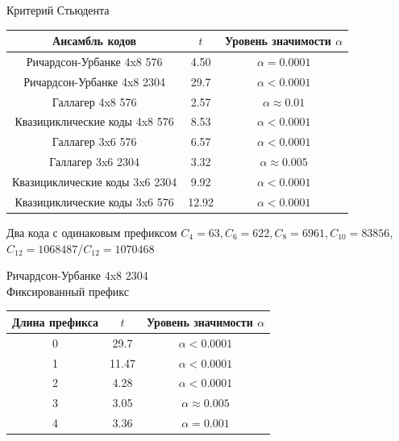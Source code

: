 \documentclass[t,13pt,graphics=pdflatex,xcolor=table,aspectratio=43]{beamer}
\begin{document}
\begin{frame}{Критерий Стьюдента}
\begin{center}
\begin{tabular}{|c|c|c|}
	\hline
	Ансамбль кодов & $t$ & Уровень значимости $\alpha$\\
	\hline
	Ричардсон-Урбанке 4x8 576 & 4.50 &  $\alpha = 0.0001$\\
	\hline
	Ричардсон-Урбанке 4x8 2304 & 29.7 & $\alpha < 0.0001$ \\
	\hline
	Галлагер 4x8 576 & 2.57 & $\alpha \approx 0.01$ \\
	\hline
	Квазициклические коды 4x8 576 & 8.53 & $\alpha < 0.0001$ \\
	\hline
	Галлагер 3x6 576 & 6.57 & $\alpha < 0.0001$ \\
	\hline
	Галлагер 3x6 2304 & 3.32 & $\alpha \approx 0.005$ \\
	\hline
	Квазициклические коды 3x6 2304 & 9.92 & $\alpha < 0.0001$ \\
	\hline
	Квазициклические коды 3x6 576 & 12.92 & $\alpha < 0.0001$ \\
	\hline
\end{tabular}
\end{center}
\end{frame}

\begin{frame}{Два кода с одинаковым префиксом}
$C_4=63, C_6=622, C_8=6961, C_{10}=83856$, $C_{12}=1068487$/$C_{12}=1070468$

\begin{figure}[h!]
\centering
\begin{subfigure}{.5\textwidth}
  \centering
\end{subfigure}%
\begin{subfigure}{.5\textwidth}
  \centering
\end{subfigure}
\end{figure}
\end{frame}

\begin{frame}{Ричардсон-Урбанке 4x8 2304 \\ Фиксированный префикс}
\begin{center}
\begin{tabular}{|c|c|c|}
	\hline
	Длина префикса & $t$ & Уровень значимости $\alpha$\\
	\hline
	0 & 29.7 &  $\alpha < 0.0001$\\
	\hline
	1 & 11.47 &  $\alpha < 0.0001$\\
	\hline
	2 & 4.28 & $\alpha < 0.0001$ \\
	\hline
	3 & 3.05 & $\alpha \approx 0.005$ \\
	\hline
	4 & 3.36 & $\alpha = 0.001$ \\
	\hline
\end{tabular}
\end{center}
\end{frame}
\end{document}
